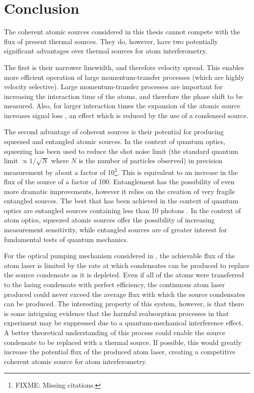\chapter{Conclusion}
\label{Conclusion}
\graphicspath{{Figures/Conclusion/}{Figures/Common/}}

The coherent atomic sources considered in this thesis cannot compete with the flux of present thermal sources.  They do, however, have two potentially significant advantages over thermal sources for atom interferometry.

The first is their narrower linewidth, and therefore velocity spread.  This enables more efficient operation of large momentum-transfer processes (which are highly velocity selective).  Large momentum-transfer processes are important for increasing the interaction time of the atoms, and therefore the phase shift to be measured.  Also, for larger interaction times the expansion of the atomic source increases signal loss \citep{Dimopoulos:2007uq}, an effect which is reduced by the use of a condensed source.

The second advantage of coherent sources is their potential for producing squeezed and entangled atomic sources.  In the context of quantum optics, squeezing has been used to reduce the shot noise limit (the standard quantum limit $\propto 1/\sqrt{N}$ where $N$ is the number of particles observed) in precision measurement by about a factor of 10\footnote{FIXME: Missing citations.}.  This is equivalent to an increase in the flux of the source of a factor of 100.  Entanglement has the possibility of even more dramatic improvements, however it relies on the creation of very fragile entangled sources.  The best that has been achieved in the context of quantum optics are entangled sources containing less than 10 photons \citep{Leibfried:2004}.  In the context of atom optics, squeezed atomic sources offer the possibility of increasing measurement sensitivity, while entangled sources are of greater interest for fundamental tests of quantum mechanics.

For the optical pumping mechanism considered in , the achievable flux of the atom laser is limited by the rate at which condensates can be produced to replace the source condensate as it is depleted.  Even if all of the atoms were transferred to the lasing condensate with perfect efficiency, the continuous atom laser produced could never exceed the average flux with which the source condensates can be produced.  The interesting property of this system, however, is that there is some intriguing evidence that the harmful reabsorption processes in that experiment may be suppressed due to a quantum-mechanical interference effect.  A better theoretical understanding of this process could enable the source condensate to be replaced with a thermal source.  If possible, this would greatly increase the potential flux of the produced atom laser, creating a competitive coherent atomic source for atom interferometry.

